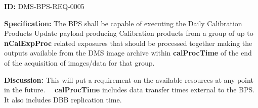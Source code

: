 \documentclass[SE,toc,lsstdraft]{lsstdoc}
\newcommand{\addendum}{}
\begin{document}
\label{DMS-BPS-REQ-0005}
\textbf{ID:} DMS-BPS-REQ-0005

\textbf{Specification:}
The BPS shall be capable of executing the Daily Calibration Products Update payload producing Calibration products from a group of up to \textbf{nCalExpProc} related exposures that should be processed together making the outputs available from the DMS image archive within \textbf{calProcTime} of the end of the acquisition of images/data for that group.

\textbf{Discussion:}
This will put a requirement on the available resources at any point in the future.   \textbf{calProcTime} includes data transfer times external to the BPS. It also includes DBB replication time.

\addendum


\end{document}
